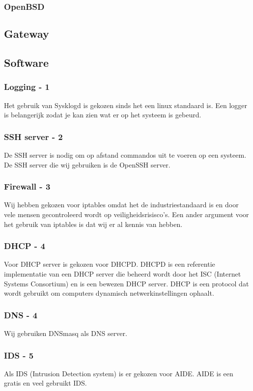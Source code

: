 \documentclass[12pt]{article}
\begin{document}
\subsubsection{OpenBSD}

\subsection{Gateway}
\subsection{Software}
\subsubsection{Logging - 1}
Het gebruik van Sysklogd is gekozen sinds het een linux standaard is. Een logger is belangerijk zodat je kan zien wat er op het systeem is gebeurd.
\subsubsection{SSH server - 2}
De SSH server is nodig om op afstand commandos uit te voeren op een systeem. De SSH server die wij gebruiken is de OpenSSH server.
\subsubsection{Firewall - 3}
Wij hebben gekozen voor iptables omdat het de industriestandaard is en door vele mensen gecontroleerd wordt op veiligheidsrisisco's. Een ander argument voor het gebruik van iptables is dat wij er al kennis van hebben.
\subsubsection{DHCP - 4}
Voor DHCP server is gekozen voor DHCPD. DHCPD is een referentie implementatie van een DHCP server die beheerd wordt door het ISC (Internet Systems Consortium) en is een bewezen DHCP server. DHCP is een protocol dat wordt gebruikt om computers dynamisch netwerkinstellingen ophaalt.
\subsubsection{DNS - 4}
Wij gebruiken DNSmasq als DNS server.
\subsubsection{IDS - 5}
Als IDS (Intrusion Detection system) is er gekozen voor AIDE. AIDE is een gratis en veel gebruikt IDS.
\end{document}
